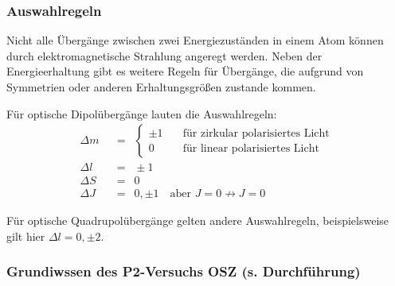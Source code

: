 \documentclass{article}
\newcommand{\widespace}{\enspace}
\newcommand{\wideeq}{\widespace = \widespace}
\begin{document}
\subsubsection{Auswahlregeln}

\cite{Dem}

Nicht alle Übergänge zwischen zwei Energiezuständen in einem Atom können durch
elektromagnetische Strahlung angeregt werden. Neben der Energieerhaltung
gibt es weitere Regeln für Übergänge, die aufgrund von Symmetrien oder anderen
Erhaltungsgrößen zustande kommen.

Für optische Dipolübergänge lauten die Auswahlregeln:
\begin{align*}
    \Delta m &\wideeq \begin{cases}
        \pm 1 \quad &\text{für zirkular polarisiertes Licht} \\
        0 \quad & \text{für linear polarisiertes Licht}
    \end{cases} \\
    \Delta l &\wideeq \pm 1 \\
    \Delta S &\wideeq 0 \\
    \Delta J &\wideeq 0, \pm 1 \quad \text{aber } J = 0 \not \to J = 0
\end{align*}

Für optische Quadrupolübergänge gelten andere Auswahlregeln, beispielsweise
gilt hier $\Delta l = 0, \pm 2$.


\subsubsection{Grundiwssen des P2-Versuchs OSZ (s. Durchführung)}
\end{document}
